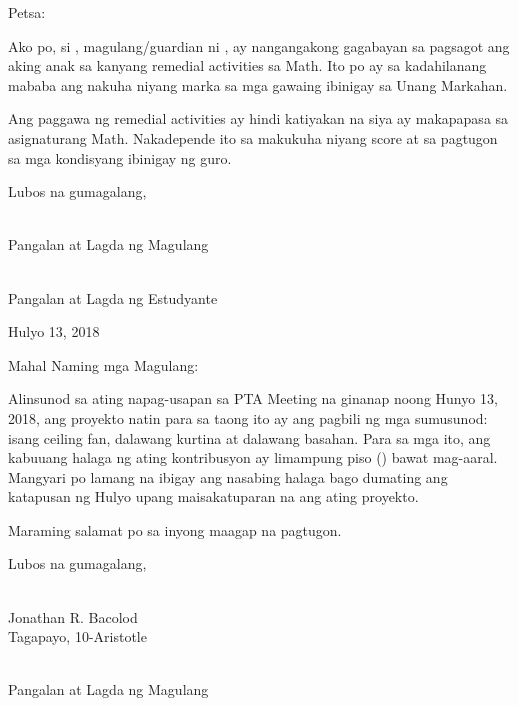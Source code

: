 \documentclass[11pt]{article}
\begin{document}
 

\begin{flushright}
Petsa: \underline{\hspace{1.5in}} 
\end{flushright} 


\vspace*{2in}

Ako po, si \underline{\hspace{1.8in}}, magulang/guardian ni \underline{\hspace{1.8in}}, 
ay nangangakong gagabayan
sa pagsagot ang aking anak sa kanyang remedial activities
sa Math. Ito po ay sa kadahilanang mababa ang nakuha niyang marka sa mga gawaing ibinigay sa Unang Markahan. 


Ang paggawa ng remedial activities ay hindi
katiyakan na siya ay makapapasa sa asignaturang Math.
Nakadepende ito sa makukuha niyang score at sa pagtugon sa
mga kondisyang ibinigay ng guro. 


\vspace*{3em}

\begin{flushright}
Lubos na gumagalang, 

\vspace*{2em}

\underline{\hspace{2.17in}} \\
Pangalan at Lagda ng Magulang

\vspace*{1in}

\underline{\hspace{2.3in}} \\
Pangalan at Lagda ng Estudyante 
\end{flushright}

\newpage 

\begin{flushright}
Hulyo 13, 2018
\end{flushright} 


\vspace*{2in}


\noindent Mahal Naming mga Magulang: 


Alinsunod sa ating napag-usapan sa PTA Meeting na ginanap noong Hunyo 13, 2018, ang proyekto natin para sa taong ito ay ang pagbili ng mga sumusunod: isang ceiling fan, dalawang kurtina at dalawang basahan. Para sa mga ito, ang kabuuang halaga ng ating kontribusyon ay limampung piso () bawat mag-aaral. Mangyari po lamang na ibigay ang nasabing halaga bago dumating ang katapusan ng Hulyo upang maisakatuparan na ang ating proyekto. 


Maraming salamat po sa inyong maagap na pagtugon. 


\vspace*{3em}

\begin{flushright}
Lubos na gumagalang, 

\vspace*{2em}

\underline{\hspace{1.5in}} \\
Jonathan R. Bacolod\\
Tagapayo, 10-Aristotle 

\end{flushright}


\noindent\underline{\hspace{2.17in}} \\
Pangalan at Lagda ng Magulang
\end{document}
